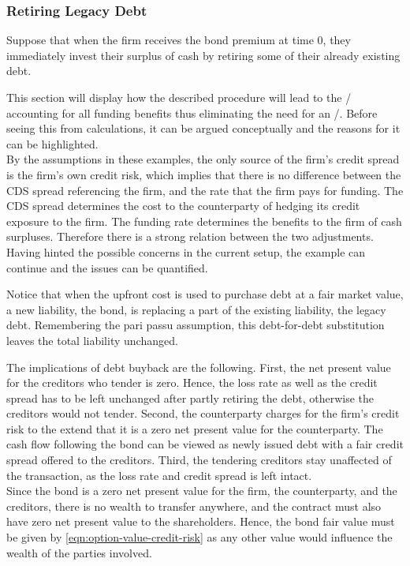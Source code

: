 \documentclass[main.tex]{subfiles}
\begin{document}
        \subsubsection{Retiring Legacy Debt}
            Suppose that when the firm receives the bond premium at time 0, 
            they immediately invest their surplus of cash by retiring some of their already existing debt.
            
            This section will display how the described procedure will lead to the \DVA/
            accounting for all funding benefits thus eliminating the need for an \FVA/.
            Before seeing this from calculations, it can be argued conceptually
            and the reasons for it can be highlighted.
            \\
            By the assumptions in these examples,
            the only source of the firm's credit spread is the firm's own credit risk, 
            which implies that there is no difference between the CDS spread referencing the firm,
            and the rate that the firm pays for funding.
            The CDS spread determines the cost to the counterparty 
            of hedging its credit exposure to the firm.
            The funding rate determines the benefits to the firm of cash surpluses.
            Therefore there is a strong relation between the two adjustments.
            \\
            Having hinted the possible concerns in the current setup, 
            the example can continue and the issues can be quantified.

            Notice that when the upfront cost is used to purchase debt at a fair market value, 
            a new liability, the bond, is replacing a part of the existing liability, the legacy debt. 
            Remembering the pari passu assumption, this debt-for-debt substitution 
            leaves the total liability unchanged.

            The implications of debt buyback are the following.
            First, the net present value for the creditors who tender is zero. 
            Hence, the loss rate as well as the credit spread has to be left unchanged
            after partly retiring the debt, otherwise the creditors would not tender. 
            Second, the counterparty charges for the firm's credit risk 
            to the extend that it is a zero net present value for the counterparty. 
            The cash flow following the bond can be viewed as newly issued debt
            with a fair credit spread offered to the creditors.
            Third, the tendering creditors stay unaffected of the transaction, 
            as the loss rate and credit spread is left intact.
            \\
            Since the bond is a zero net present value for the firm, 
            the counterparty, and the creditors, there is no wealth to transfer anywhere,
            and the contract must also have zero net present value to the shareholders. 
            Hence, the bond fair value must be given by \cref{eqn:option-value-credit-risk} 
            as any other value would influence the wealth of the parties involved.
\end{document}
